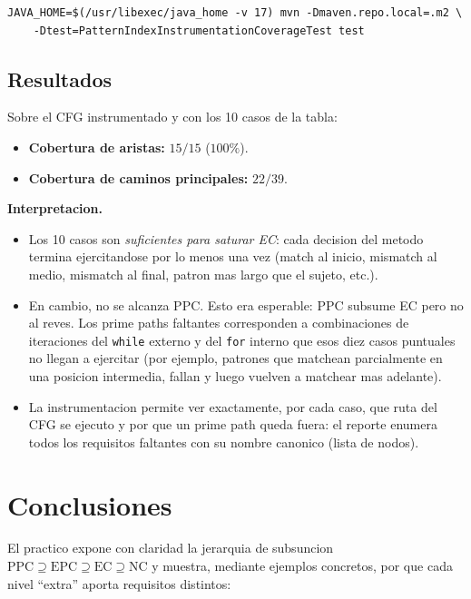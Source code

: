 \documentclass[12pt,a4paper]{article}
\begin{document}
\begin{lstlisting}[style=codestyle]
JAVA_HOME=$(/usr/libexec/java_home -v 17) mvn -Dmaven.repo.local=.m2 \
    -Dtest=PatternIndexInstrumentationCoverageTest test
\end{lstlisting}

\subsection{Resultados}

Sobre el CFG instrumentado y con los 10 casos de la tabla:

\begin{itemize}
  \item \textbf{Cobertura de aristas:} $15 / 15$ ($100\%$).
  \item \textbf{Cobertura de caminos principales:} $22 / 39$.
\end{itemize}

\textbf{Interpretacion.}
\begin{itemize}
  \item Los 10 casos son \emph{suficientes para saturar EC}: cada decision del metodo termina
  ejercitandose por lo menos una vez (match al inicio, mismatch al medio, mismatch al final,
  patron mas largo que el sujeto, etc.).
  \item En cambio, no se alcanza PPC. Esto era esperable: PPC subsume EC pero no al reves. Los
  prime paths faltantes corresponden a combinaciones de iteraciones del \texttt{while} externo y
  del \texttt{for} interno que esos diez casos puntuales no llegan a ejercitar (por ejemplo,
  patrones que matchean parcialmente en una posicion intermedia, fallan y luego vuelven a
  matchear mas adelante).
  \item La instrumentacion permite ver exactamente, por cada caso, que ruta del CFG se ejecuto
  y por que un prime path queda fuera: el reporte enumera todos los requisitos faltantes con su
  nombre canonico (lista de nodos).
\end{itemize}

\section*{Conclusiones}

El practico expone con claridad la jerarquia de subsuncion
$\text{PPC} \supseteq \text{EPC} \supseteq \text{EC} \supseteq \text{NC}$ y muestra, mediante
ejemplos concretos, por que cada nivel ``extra'' aporta requisitos distintos:
\end{document}
